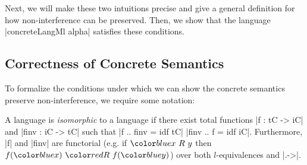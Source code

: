 Next, we will make these two intuitions precise and give a general
definition for how non-interference can be preserved.  Then, we
show that the language |concreteLangMl alpha| satisfies these
conditions.



\subsection{Correctness of Concrete Semantics}

To formalize the conditions under which we can show the concrete
semantics preserve non-interference, we require some notation:

\begin{definition}
  A language  is \textit{isomorphic} to a
  language  if there exist total functions |f
  : tC -> iC| and |finv : iC -> tC| such that |f .. finv = idf tC| |finv
  .. f = idf iC|.  Furthermore, |f| and |finv| are functorial (e.g. if
  $\abs{x\ R\ y}$ then $f(\abs{x})\ \con{R}\ f(\abs{y})$) over both
  $l$-equivalences and |.->|.
\end{definition}


